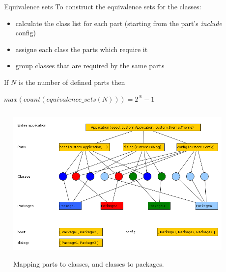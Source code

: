 \documentclass[final]{beamer}
\newlength{\sepwid}
\newlength{\onecolwid}
\newlength{\twocolwid}
\begin{document}
\begin{frame}[t]
\begin{columns}[t]
\begin{column}{\twocolwid}
\begin{columns}[t,totalwidth=\twocolwid]
    \begin{column}{\sepwid}\end{column}			%
    \begin{column}{\onecolwid}
      \begin{block}{Equivalence sets}
        To construct the equivalence sets for the classes:
        \begin{itemize}\justifying
          \item calculate the class list for each part (starting from the
            part's \textit{include} config)
          \item assigne each class the parts which require it
          \item group classes that are required by the same parts
        \end{itemize}
        If $N$ is the number of defined parts then\\
        \begin{center}
          $ max(count(equivalence\_sets(N))) = 2^{N} - 1 $
        \end{center}
      \end{block}
    \end{column}

    \end{columns}


    \begin{figure}   %
      \begin{center}
        \includegraphics[width=20in]{g_part_layers.png} \\
        \caption{Mapping parts to classes, and classes to packages.}
        \label{fig:corrSubsys}
      \end{center}
    \end{figure}


\end{column}
\end{columns}
\end{frame}
\end{document}
